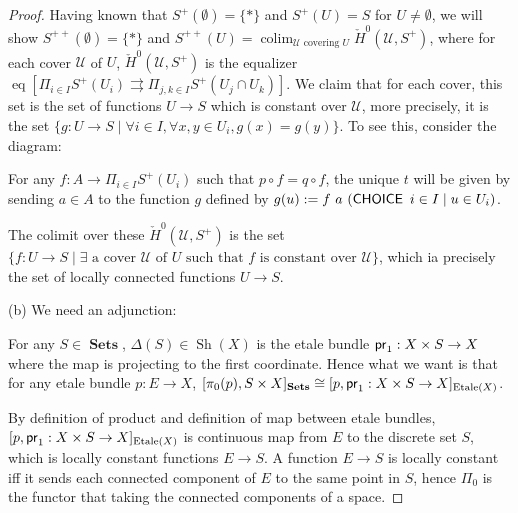\documentclass[a4paper]{article}
\DeclareMathOperator{\Sets}{\mathbf {Sets}}
\DeclareMathOperator{\Sh}{\text {Sh}}
\DeclareMathOperator{\Et}{\text {Etale}}
\DeclareMathOperator{\CHOICE}{\sf CHOICE}
\DeclareMathOperator{\pr}{\sf pr}
\DeclareMathOperator{\colim}{\text {colim}}
\DeclareMathOperator{\eqlz}{\text {eq}}
\begin{document}
\begin{proof}
    Having known that $S^+(\emptyset)= \{*\}$ and $S^+(U)=S$ for $U\ne \emptyset$, we will show $S^{++}(\emptyset)=\{*\}$ and $S^{++}(U)=\colim_{\text{$\mathcal U$ covering $U$}}\check{H}^0({\mathcal U},S^+)$, where for each cover $\mathcal U$ of $U$, $\check{H}^0({\mathcal U},S^+)$ is the equalizer $\eqlz[\Pi_{i\in I}S^+(U_i)\rightrightarrows\Pi_{j,k\in I}S^+(U_j\cap U_k)]$. We claim that for each cover, this set is the set of functions $U\to S$ which is constant over $\mathcal U$, more precisely, it is the set $\{g:U\to S\mid \forall i\in I,\forall x, y \in U_i, g(x)=g(y)\}$. To see this, consider the diagram:

    \begin{center}
    \end{center}

    For any $f: A\to \Pi_{i\in I}S^+(U_i)$ such that $p\circ f = q\circ f$, the unique $t$ will be given by sending $a\in A$ to the function $g$ defined by $g(u):= f \ a \ (\CHOICE \ {i\in I\mid u\in U_i})$. 


    
    
    The colimit over these $\check{H}^0({\mathcal U},S^+)$ is the set $\{f: U\to S\mid\text{$\exists$ a cover $\mathcal U$ of $U$ such that $f$ is constant over $\mathcal U$}\}$, which ia precisely the set of locally connected functions $U\to S$.




    (b) We need an adjunction:
    \begin{center}
    \end{center}

    For any $S\in \Sets$, $\Delta(S)\in \Sh(X)$ is the etale bundle $\pr_1:X\times S\to X$ where the map is projecting to the first coordinate. Hence what we want is that for any etale bundle $p:E\to X$, $[\pi_0(p),S\times X]_{\Sets} \cong [p,\pr_1:X\times S\to X]_{\Et(X)}$. 

    By definition of product and definition of map between etale bundles, $[p,\pr_1:X\times S\to X]_{\Et(X)}$ is continuous map from $E$ to the discrete set $S$, which is locally constant functions $E\to S$. A function $E\to S$ is locally constant iff it sends each connected component of $E$ to the same point in $S$, hence $\Pi_0$ is the functor that taking the connected components of a space.


\end{proof}
\end{document}
